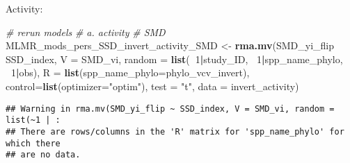 \documentclass[]{article}
\newenvironment{Shaded}{\begin{snugshade}}{\end{snugshade}}
\newcommand{\KeywordTok}[1]{\textcolor[rgb]{0.13,0.29,0.53}{\textbf{#1}}}
\newcommand{\DataTypeTok}[1]{\textcolor[rgb]{0.13,0.29,0.53}{#1}}
\newcommand{\DecValTok}[1]{\textcolor[rgb]{0.00,0.00,0.81}{#1}}
\newcommand{\StringTok}[1]{\textcolor[rgb]{0.31,0.60,0.02}{#1}}
\newcommand{\CommentTok}[1]{\textcolor[rgb]{0.56,0.35,0.01}{\textit{#1}}}
\newcommand{\OperatorTok}[1]{\textcolor[rgb]{0.81,0.36,0.00}{\textbf{#1}}}
\newcommand{\NormalTok}[1]{#1}
\begin{document}
\begin{Shaded}
\end{Shaded}

Activity:

\begin{Shaded}
\begin{Highlighting}[]
  \CommentTok{# rerun models}
    \CommentTok{# a. activity}
    \CommentTok{# SMD}
\NormalTok{      MLMR_mods_pers_SSD_invert_activity_SMD <-}\StringTok{ }\KeywordTok{rma.mv}\NormalTok{(SMD_yi_flip }\OperatorTok{~}\StringTok{ }\NormalTok{SSD_index, }\DataTypeTok{V =}\NormalTok{ SMD_vi, }
                                          \DataTypeTok{random =} \KeywordTok{list}\NormalTok{(}\OperatorTok{~}\DecValTok{1}\OperatorTok{|}\NormalTok{study_ID, }\OperatorTok{~}\DecValTok{1}\OperatorTok{|}\NormalTok{spp_name_phylo, }\OperatorTok{~}\DecValTok{1}\OperatorTok{|}\NormalTok{obs), }
                                          \DataTypeTok{R =} \KeywordTok{list}\NormalTok{(}\DataTypeTok{spp_name_phylo=}\NormalTok{phylo_vcv_invert), }\DataTypeTok{control=}\KeywordTok{list}\NormalTok{(}\DataTypeTok{optimizer=}\StringTok{"optim"}\NormalTok{), }
                                          \DataTypeTok{test =} \StringTok{"t"}\NormalTok{, }\DataTypeTok{data =}\NormalTok{ invert_activity)}
\end{Highlighting}
\end{Shaded}

\begin{verbatim}
## Warning in rma.mv(SMD_yi_flip ~ SSD_index, V = SMD_vi, random = list(~1 | :
## There are rows/columns in the 'R' matrix for 'spp_name_phylo' for which there
## are no data.
\end{verbatim}
\end{document}
